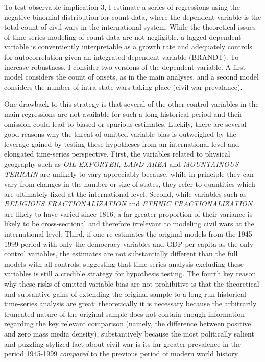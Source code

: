 \documentclass[11pt,article,oneside]{memoir}
\begin{document}
To test observable implication 3, I estimate a series of regressions
using the negative binomial distribution for count data, where the
dependent variable is the total count of civil wars in the international
system. While the theoretical issues of time-series modeling of count
data are not negligible, a lagged dependent variable is conventiently
interpretable as a growth rate and adequately controls for
autocorrelation given an integrated dependent variable (BRANDT). To
increase robustness, I consider two versions of the dependent variable.
A first model considers the count of onsets, as in the main analyses,
and a second model considers the number of intra-state wars taking place
(civil war prevalance).

One drawback to this strategy is that several of the other control
variables in the main regressions are not available for such a long
historical period and their omission could lead to biased or spurious
estimates. Luckily, there are several good reasons why the threat of
omitted variable bias is outweighed by the leverage gained by testing
these hypotheses from an international-level and elongated time-series
perspective. First, the variables related to physical geography such as
\emph{OIL EXPORTER}, \emph{LAND AREA} and \emph{MOUNTAINOUS TERRAIN} are
unlikely to vary appreciably because, while in principle they can vary
from changes in the number or size of states, they refer to quantities
which are ultimately fixed at the international level. Second, while
variables such as \emph{RELIGIOUS FRACTIONALIZATION} and \emph{ETHNIC
FRACTIONALIZATION} are likely to have varied since 1816, a far greater
proportion of their variance is likely to be cross-sectional and
therefore irrelevant to modeling civil wars at the international level.
Third, if one re-estimates the original models from the 1945-1999 period
with only the democracy variables and GDP per capita as the only control
variables, the estimates are not substantially different than the full
models with all controls, suggesting that time-series analysis excluding
these variables is still a credible strategy for hypothesis testing. The
fourth key reason why these risks of omitted variable bias are not
prohibitive is that the theoretical and subsantive gains of extending
the original sample to a long-run historical time-series analysis are
great: theoretically it is necessary because the arbitrarily truncated
nature of the original sample does not contain enough information
regarding the key relevant comparison (namely, the difference between
positive and zero mass media density), substantively because the most
politically salient and puzzling stylized fact about civil war is its
far greater prevalence in the period 1945-1999 \emph{compared} to the
previous period of modern world history.
\end{document}
